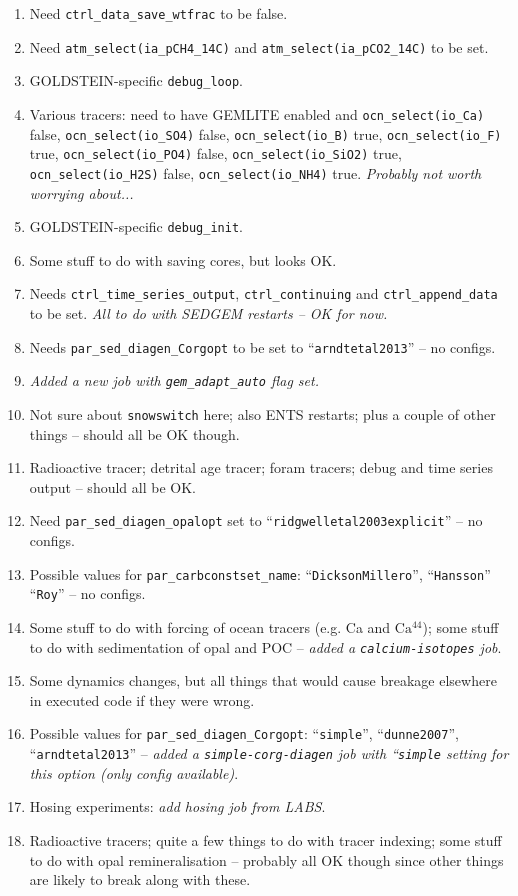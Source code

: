 \documentclass[a4paper,10pt,article]{memoir}
\begin{document}
\begin{enumerate}
  \item{Need \texttt{ctrl\_data\_save\_wtfrac} to be false.}
  \item{Need \texttt{atm\_select(ia\_pCH4\_14C)} and
    \texttt{atm\_select(ia\_pCO2\_14C)} to be set.}
  \item{GOLDSTEIN-specific \texttt{debug\_loop}.}
  \item{Various tracers: need to have GEMLITE enabled and
    \texttt{ocn\_select(io\_Ca)} false, \texttt{ocn\_select(io\_SO4)}
    false, \texttt{ocn\_select(io\_B)} true,
    \texttt{ocn\_select(io\_F)} true, \texttt{ocn\_select(io\_PO4)}
    false, \texttt{ocn\_select(io\_SiO2)} true,
    \texttt{ocn\_select(io\_H2S)} false, \texttt{ocn\_select(io\_NH4)}
    true.  \emph{Probably not worth worrying about...}}
  \item{GOLDSTEIN-specific \texttt{debug\_init}.}
  \item{Some stuff to do with saving cores, but looks OK.}
  \item{Needs \texttt{ctrl\_time\_series\_output},
    \texttt{ctrl\_continuing} and \texttt{ctrl\_append\_data} to be
    set.  \emph{All to do with SEDGEM restarts -- OK for now.}}
  \item{Needs \texttt{par\_sed\_diagen\_Corgopt} to be set to
    ``\texttt{arndtetal2013}'' -- no configs.}
  \item{\emph{Added a new job with \texttt{gem\_adapt\_auto} flag
      set.}}
  \item{Not sure about \texttt{snowswitch} here; also ENTS restarts;
    plus a couple of other things -- should all be OK though.}
  \item{Radioactive tracer; detrital age tracer; foram tracers; debug
    and time series output -- should all be OK.}
  \item{Need \texttt{par\_sed\_diagen\_opalopt} set to
    ``\texttt{ridgwelletal2003explicit}'' -- no configs.}
  \item{Possible values for \texttt{par\_carbconstset\_name}:
    ``\texttt{DicksonMillero}'', ``\texttt{Hansson}''
    ``\texttt{Roy}'' -- no configs.}
  \item{Some stuff to do with forcing of ocean tracers (e.g. Ca and
    $\mathrm{Ca^{44}}$); some stuff to do with sedimentation of opal
    and POC -- \emph{added a \texttt{calcium-isotopes} job}.}
  \item{Some dynamics changes, but all things that would cause
    breakage elsewhere in executed code if they were wrong.}
  \item{Possible values for \texttt{par\_sed\_diagen\_Corgopt}:
    ``\texttt{simple}'', ``\texttt{dunne2007}'',
    ``\texttt{arndtetal2013}'' -- \emph{added a
      \texttt{simple-corg-diagen} job with ``\texttt{simple} setting
      for this option (only config available)}.}
  \item{Hosing experiments: \emph{add hosing job from LABS}.}
  \item{Radioactive tracers; quite a few things to do with tracer
    indexing; some stuff to do with opal remineralisation -- probably
    all OK though since other things are likely to break along with
    these.}
\end{enumerate}
\end{document}
